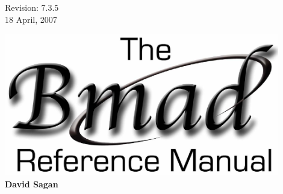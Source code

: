 \thispagestyle{empty}

\begin{flushright}
\large
  Revision: 7.3.5 \\
  18 April, 2007 \\
\end{flushright}

\vfill

{
\begin{center}
\includegraphics[width=12cm]{bmad-ref-manual.eps} \\
\vskip 0.3in
\huge\bf David Sagan
\end{center}
}

\vfill
\break
